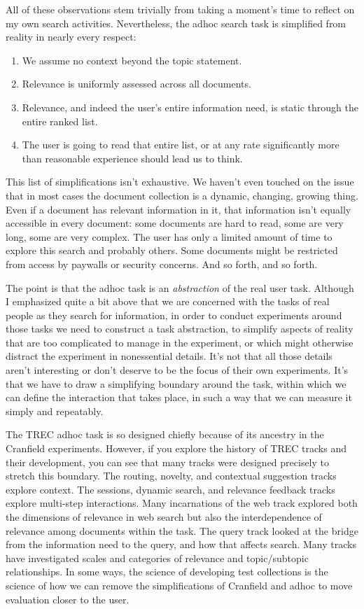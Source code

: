\documentclass[nobib]{tufte-book}
\begin{document}
All of these observations stem trivially from taking a moment's time to reflect on my own search activities.  Nevertheless, the adhoc search task is simplified from reality in nearly every respect:
\begin{enumerate}
    \item We assume no context beyond the topic statement.
    \item Relevance is uniformly assessed across all documents.
    \item Relevance, and indeed the user's entire information need, is static through the entire ranked list.
    \item The user is going to read that entire list, or at any rate significantly more than reasonable experience should lead us to think.
\end{enumerate}
This list of simplifications isn't exhaustive.  We haven't even touched on the issue that in most cases the document collection is a dynamic, changing, growing thing.  Even if a document has relevant information in it, that information isn't equally accessible in every document: some documents are hard to read, some are very long, some are very complex.  The user has only a limited amount of time to explore this search and probably others.  Some documents might be restricted from access by paywalls or security concerns.  And so forth, and so forth.

The point is that the adhoc task is an {\em abstraction} of the real user task.  Although I emphasized quite a bit above that we are concerned with the tasks of real people as they search for information, in order to conduct experiments around those tasks we need to construct a task abstraction, to simplify aspects of reality that are too complicated to manage in the experiment, or which might otherwise distract the experiment in nonessential details.  It's not that all those details aren't interesting or don't deserve to be the focus of their own experiments.  It's that we have to draw a simplifying boundary around the task, within which we can define the interaction that takes place, in such a way that we can measure it simply and repeatably.

The TREC adhoc task is so designed chiefly because of its ancestry in the Cranfield experiments. However, if you explore the history of TREC tracks and their development, you can see that many tracks were designed precisely to stretch this boundary.  The routing, novelty, and contextual suggestion tracks explore context.  The sessions, dynamic search, and relevance feedback tracks explore multi-step interactions.  Many incarnations of the web track explored both the dimensions of relevance in web search but also the interdependence of relevance among documents within the task.  The query track looked at the bridge from the information need to the query, and how that affects search.  Many tracks have investigated scales and categories of relevance and topic/subtopic relationships.  In some ways, the science of developing test collections is the science of how we can remove the simplifications of Cranfield and adhoc to move evaluation closer to the user.
\end{document}
